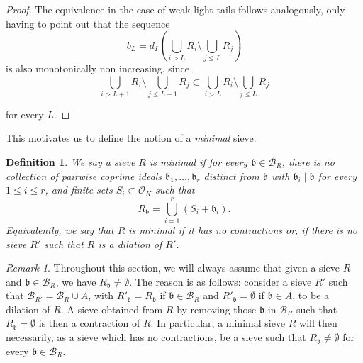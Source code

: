 \documentclass[a4paper,11pt,reqno]{amsart}
\theoremstyle{plain}
\newtheorem{definition}[theorem]{Definition}
\theoremstyle{remark}
\newtheorem{remark}[theorem]{Remark}
\newcommand{\cb}{\mathcal{B}}
\newcommand{\co}{\mathcal{O}}
\newcommand{\gb}{\mathfrak{b}}
\begin{document}
\begin{proof}
			The equivalence in the case of weak light tails follows analogously, only having to point out that the sequence $$b_L = \overline{d}_I\left(\bigcup_{i > L} R_i\setminus \bigcup_{j \leq L} R_j \right)$$ is also monotonically non increasing, since $$\bigcup_{i > L+1} R_i\setminus \bigcup_{j \leq L+1} R_j \subset \bigcup_{i > L} R_i\setminus \bigcup_{j \leq L} R_j  $$
			
			
			for every $L$.
		\end{proof}
		
		
		This motivates us to define the notion of a \textit{minimal} sieve.
		\begin{definition}
			\label{def: minimal sieve}
			We say a sieve $R$ is minimal if for every $\gb \in \cb_R$, there is no collection of pairwise coprime ideals $\gb_1 , \dots, \gb_r $ distinct from $\gb$ with $\gb_i \mid \gb$ for every $1\leq i\leq r$, and finite sets $S_i \subset \co_K$ such that  $$R_\gb = \bigcup_{i=1}^r (S_i + \gb_i).$$ Equivalently, we say that $R$ is minimal if it has no contractions or, if there is no sieve $R'$ such that $R$ is a dilation of $R'$.
			
		\end{definition}
		
		\begin{remark}
			Throughout this section, we will always assume that given a sieve $R$ and $\gb \in \cb_R$, we have $R_\gb \neq \emptyset$. The reason is as follows: consider a sieve $R'$ such that $\cb_{R'} = \cb_R \cup A$, with $R'_\gb = R_\gb$ if $\gb \in \cb_R$ and $R'_\gb =\emptyset$ if $\gb \in A$, to be a dilation of $R$. A sieve obtained from $R$ by removing those  $\gb $ in $\cb_R$ such that $R_\gb = \emptyset$ is then a contraction of $R$. In particular, a minimal sieve $R$ will then necessarily, as a sieve which has no contractions, be a sieve such that $R_\gb\neq \emptyset$ for every $\gb \in \cb_R$.
		\end{remark}
		
\end{document}
